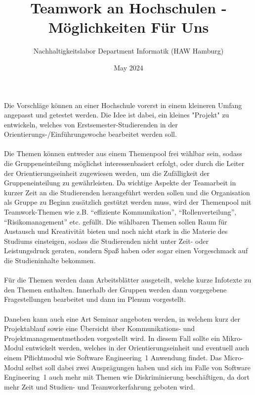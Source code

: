 \documentclass[a4paper]{article}
\title{Teamwork an Hochschulen - Möglichkeiten Für Uns}
\author{Nachhaltigkeitslabor Department Informatik (HAW Hamburg)}
\date{May 2024}
\begin{document}
\maketitle


Die Vorschläge können an einer Hochschule vorerst in einem kleineren Umfang angepasst und getestet werden. Die Idee ist dabei, ein kleines "Projekt" zu entwickeln, welches von Erstsemester-Studierenden in der Orientierungs-/Einführungswoche bearbeitet werden soll.\\\\Die Themen können entweder aus einem Themenpool frei wählbar sein, sodass die Gruppeneinteilung möglichst interessenbasiert erfolgt, oder durch die Leiter der Orientierungseinheit zugewiesen werden, um die Zufälligkeit der Gruppeneinteilung zu gewährleisten. Da wichtige Aspekte der Teamarbeit in kurzer Zeit an die Studierenden herangeführt werden sollen und die Organisation als Gruppe zu Beginn zusätzlich gestützt werden muss, wird der Themenpool mit Teamwork-Themen wie z.B. "`effiziente Kommunikation"', "`Rollenverteilung"', "`Risikomanagement"' etc. gefüllt. %
Die wählbaren Themen sollen Raum für Austausch und Kreativität bieten und noch nicht stark in die Materie des Studiums einsteigen, sodass die Studierenden nicht unter Zeit- oder Leistungsdruck geraten, sondern Spaß haben oder sogar einen Vorgeschmack auf die Studieninhalte bekommen.\\\\ Für die Themen werden dann Arbeitsblätter ausgeteilt, welche kurze Infotexte zu den Themen enthalten. Innerhalb der Gruppen werden dann vorgegebene Fragestellungen bearbeitet und dann im Plenum vorgestellt.\\\\ Daneben kann auch eine Art Seminar angeboten werden, in welchem kurz der Projektablauf sowie eine Übersicht über Kommunikations- und Projektmanagementmethoden vorgestellt wird. In diesem Fall sollte ein Mikro-Modul entwickelt werden, welches in der Orientierungseinheit und eventuell auch einem Pflichtmodul wie Software Engineering~1 Anwendung findet. Das Micro-Modul selbst soll dabei zwei Ausprägungen haben und sich im Falle von Software Engineering~1 auch mehr mit Themen wie Diskriminierung beschäftigen, da dort mehr Zeit und Studien- und Teamworkerfahrung geboten wird.\\\\
\end{document}
